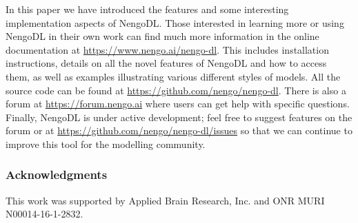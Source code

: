 \documentclass{article}
\begin{document}
In this paper we have introduced the features and some interesting implementation aspects of NengoDL.  Those interested in learning more or using NengoDL in their own work can find much more information in the online documentation at \url{https://www.nengo.ai/nengo-dl}.  This includes installation instructions, details on all the novel features of NengoDL and how to access them, as well as examples illustrating various different styles of models.  All the source code can be found at \url{https://github.com/nengo/nengo-dl}.  There is also a forum at \url{https://forum.nengo.ai} where users can get help with specific questions.  Finally, NengoDL is under active development; feel free to suggest features on the forum or at \url{https://github.com/nengo/nengo-dl/issues} so that we can continue to improve this tool for the modelling community.

\subsubsection*{Acknowledgments}

This work was supported by Applied Brain Research, Inc. and ONR MURI N00014-16-1-2832.

\small



\end{document}
